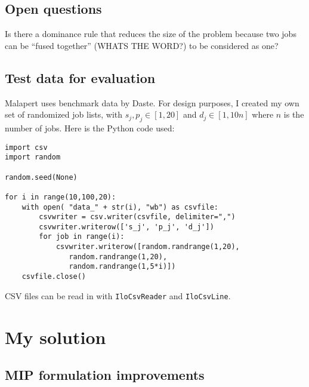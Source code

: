 \documentclass[13pt, letterpaper, twoside]{book}
\begin{document}


\section{Open questions}
\begin{alist}
\item{Is there a dominance rule that reduces the size of the problem because two
jobs can be ``fused together'' (WHATS THE WORD?) to be considered as one?}
\end{alist}

\section{Test data for evaluation}
Malapert uses benchmark data by Daste. For design purposes, I created my own set of randomized job lists, with $s_j, p_j \in [1, 20]$ and $d_j \in [1, 10n]$ where $n$ is the number of jobs. Here is the Python code used:

\lstset{language=Python}
\begin{lstlisting}
import csv
import random

random.seed(None)

for i in range(10,100,20):
    with open( "data_" + str(i), "wb") as csvfile:
        csvwriter = csv.writer(csvfile, delimiter=",")
        csvwriter.writerow(['s_j', 'p_j', 'd_j'])
        for job in range(i):
            csvwriter.writerow([random.randrange(1,20),
               random.randrange(1,20),
               random.randrange(1,5*i)])
    csvfile.close()
\end{lstlisting}

CSV files can be read in with \texttt{IloCsvReader} and \texttt{IloCsvLine}.


\chapter{My solution}
\section{MIP formulation improvements}
\end{document}

